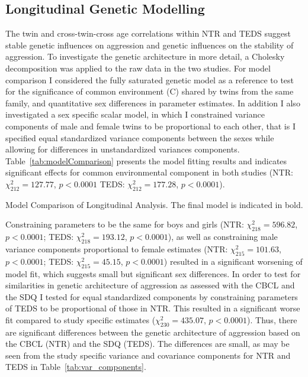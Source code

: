 \subsection{Longitudinal Genetic Modelling}
The twin and cross-twin-cross age correlations within NTR and TEDS suggest stable genetic influences on aggression and genetic influences on the stability of aggression.
To investigate the genetic architecture in more detail, a Cholesky decomposition was applied to the raw data in the two studies.
For model comparison I considered the fully saturated genetic model as a reference to test for the significance of common environment (C) shared by twins from the same family, and quantitative sex differences in parameter estimates.
In addition I also investigated a sex specific scalar model, in which I constrained variance components of male and female twins to be proportional to each other, that is I specified equal standardized variance components between the sexes while allowing for differences in unstandardized variances components.
Table~\ref{tab:modelComparison} presents the model fitting results and indicates significant effects for common environmental component in both studies (NTR: $\chi^2_{212}= 127.77$, $p<0.0001$ TEDS: $\chi^2_{212}= 177.28$, $p<0.0001$).
\begin{table}
  \centering
  \caption{Model Comparison of Longitudinal Analysis.
  The final model is indicated in bold.}\label{tab:modelComparison}
\end{table}
Constraining parameters to be the same for boys and girls (NTR: $\chi^2_{218}= 596.82$, $p<0.0001$; TEDS: $\chi^2_{218}= 193.12$, $p<0.0001$), as well as constraining male variance components proportional to female estimates (NTR: $\chi^2_{215}= 101.63$, $p<0.0001$; TEDS: $\chi^2_{215}= 45.15$, $p<0.0001$) resulted in a significant worsening of model fit, which suggests small but significant sex differences.
In order to test for similarities in genetic architecture of aggression as assessed with the CBCL and the SDQ I tested for equal standardized components by constraining parameters of TEDS to be proportional of those in NTR\@.
This resulted in a significant worse fit compared to study specific estimates ($\chi^2_{230}= 435.07$, $p<0.0001$).
Thus, there are significant differences between the genetic architecture of aggression based on the CBCL (NTR) and the SDQ (TEDS).
The differences are small, as may be seen from the study specific variance and covariance components for NTR and TEDS in Table~\ref{tab:var_components}.
